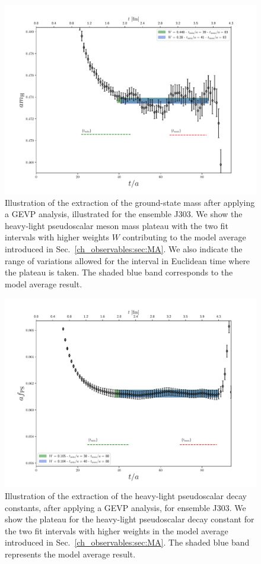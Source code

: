 \begin{figure}
  	\centering
  	\includegraphics[scale=0.5]{./cap6/figs/matching/m8_plateau.pdf}
  	\caption{Illustration of the extraction of the ground-state mass after applying a GEVP analysis, illustrated for the ensemble J303. We show the heavy-light pseudoscalar meson mass plateau with the two fit intervals with higher weights $W$ contributing to the model average introduced in Sec.~\ref{ch_observables:sec:MA}. We also indicate the range of variations allowed for the interval in Euclidean time where the plateau is taken. The shaded blue band  corresponds to the model average result.} 
\label{fig:meff_plateau} 
\end{figure}

\begin{figure}
	\centering
	\includegraphics[scale=0.5]{./cap6/figs/fds/f8_plateau.pdf}
	\caption{Illustration of the extraction of the heavy-light pseudoscalar decay constants, after applying a GEVP analysis, for ensemble J303. We show the plateau for the heavy-light pseudoscalar decay constant for the two fit intervals with higher weights in the model average introduced in Sec.~\ref{ch_observables:sec:MA}. The shaded blue band represents the model average result. }
	\label{fig:decay_plateau} 
\end{figure}